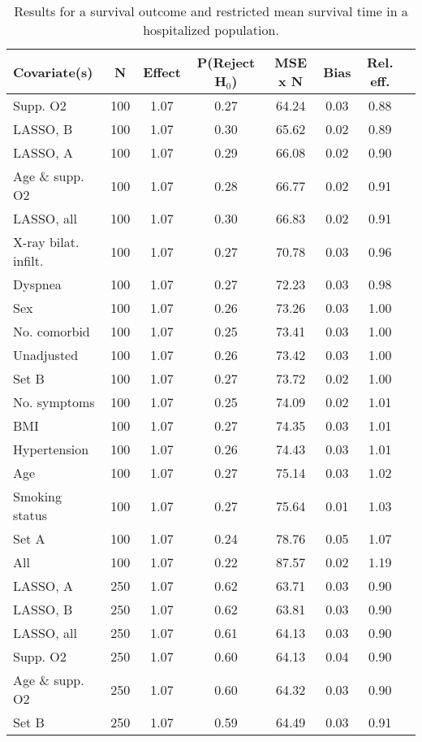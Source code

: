\documentclass{article}
\begin{document}
{\tabcolsep=6pt  %
\begin{longtable}{lccccccc}
\caption{Results for a survival outcome and restricted mean survival time in a hospitalized population.}\label{tab3}\\
Covariate(s) & N & Effect & P(Reject H$_0$) & MSE x N & Bias & Rel. eff.\\ \midrule
Supp. O2 & 100 & 1.07 & 0.27 & 64.24 & 0.03 & 0.88\\
LASSO, B & 100 & 1.07 & 0.30 & 65.62 & 0.02 & 0.89\\
LASSO, A & 100 & 1.07 & 0.29 & 66.08 & 0.02 & 0.90\\
Age \& supp. O2 & 100 & 1.07 & 0.28 & 66.77 & 0.02 & 0.91\\
LASSO, all & 100 & 1.07 & 0.30 & 66.83 & 0.02 & 0.91\\
X-ray bilat. infilt. & 100 & 1.07 & 0.27 & 70.78 & 0.03 & 0.96\\
Dyspnea & 100 & 1.07 & 0.27 & 72.23 & 0.03 & 0.98\\
Sex & 100 & 1.07 & 0.26 & 73.26 & 0.03 & 1.00\\
No. comorbid & 100 & 1.07 & 0.25 & 73.41 & 0.03 & 1.00\\
Unadjusted & 100 & 1.07 & 0.26 & 73.42 & 0.03 & 1.00\\
Set B & 100 & 1.07 & 0.27 & 73.72 & 0.02 & 1.00\\
No. symptoms & 100 & 1.07 & 0.25 & 74.09 & 0.02 & 1.01\\
BMI & 100 & 1.07 & 0.27 & 74.35 & 0.03 & 1.01\\
Hypertension & 100 & 1.07 & 0.26 & 74.43 & 0.03 & 1.01\\
Age & 100 & 1.07 & 0.27 & 75.14 & 0.03 & 1.02\\
Smoking status & 100 & 1.07 & 0.27 & 75.64 & 0.01 & 1.03\\
Set A & 100 & 1.07 & 0.24 & 78.76 & 0.05 & 1.07\\
All & 100 & 1.07 & 0.22 & 87.57 & 0.02 & 1.19\\ \midrule
LASSO, A & 250 & 1.07 & 0.62 & 63.71 & 0.03 & 0.90\\
LASSO, B & 250 & 1.07 & 0.62 & 63.81 & 0.03 & 0.90\\
LASSO, all & 250 & 1.07 & 0.61 & 64.13 & 0.03 & 0.90\\
Supp. O2 & 250 & 1.07 & 0.60 & 64.13 & 0.04 & 0.90\\
Age \& supp. O2 & 250 & 1.07 & 0.60 & 64.32 & 0.03 & 0.90\\
Set B & 250 & 1.07 & 0.59 & 64.49 & 0.03 & 0.91\\

\end{longtable}}
\end{document}
